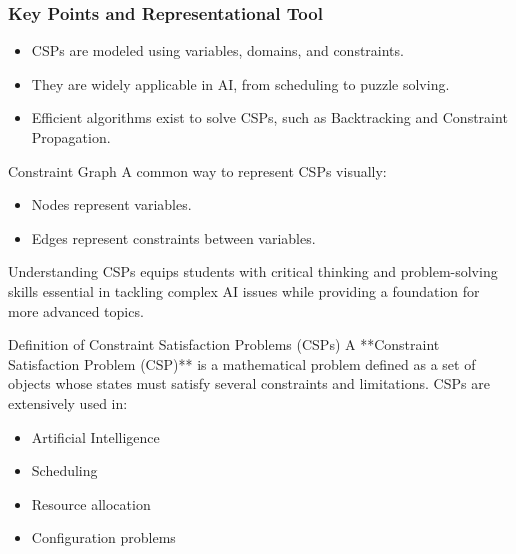 \documentclass[aspectratio=169]{beamer}
\begin{document}
\begin{frame}[fragile]
    \frametitle{Key Points and Representational Tool}
    \begin{itemize}
        \item CSPs are modeled using variables, domains, and constraints.
        \item They are widely applicable in AI, from scheduling to puzzle solving.
        \item Efficient algorithms exist to solve CSPs, such as Backtracking and Constraint Propagation.
    \end{itemize}

    \begin{block}{Constraint Graph}
        A common way to represent CSPs visually:
        \begin{itemize}
            \item Nodes represent variables.
            \item Edges represent constraints between variables.
        \end{itemize}
    \end{block}
    
    Understanding CSPs equips students with critical thinking and problem-solving skills essential in tackling complex AI issues while providing a foundation for more advanced topics.
\end{frame}

\begin{frame}[fragile]{Definition of Constraint Satisfaction Problems (CSPs)}
  A **Constraint Satisfaction Problem (CSP)** is a mathematical problem defined as a set of objects whose states must satisfy several constraints and limitations. CSPs are extensively used in:
  \begin{itemize}
    \item Artificial Intelligence
    \item Scheduling
    \item Resource allocation
    \item Configuration problems
  \end{itemize}
\end{frame}
\end{document}
